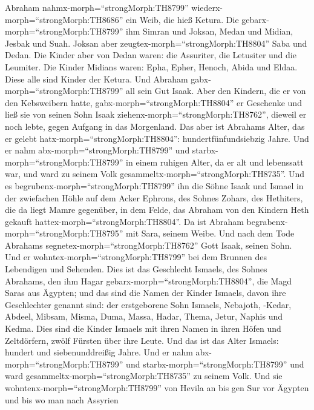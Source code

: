  Abraham nahmx-morph=``strongMorph:TH8799''
wiederx-morph=``strongMorph:TH8686'' ein Weib, die hieß Ketura.
 Die gebarx-morph=``strongMorph:TH8799'' ihm Simran und
Joksan, Medan und Midian, Jesbak und Suah.  Joksan aber
zeugtex-morph=``strongMorph:TH8804'' Saba und Dedan. Die Kinder aber von
Dedan waren: die Assuriter, die Letusiter und die Leumiter. 
Die Kinder Midians waren: Epha, Epher, Henoch, Abida und Eldaa. Diese
alle sind Kinder der Ketura.  Und Abraham
gabx-morph=``strongMorph:TH8799'' all sein Gut Isaak.  Aber
den Kindern, die er von den Kebsweibern hatte,
gabx-morph=``strongMorph:TH8804'' er Geschenke und ließ sie von seinen
Sohn Isaak ziehenx-morph=``strongMorph:TH8762'', dieweil er noch lebte,
gegen Aufgang in das Morgenland.  Das aber ist Abrahams
Alter, das er gelebt hatx-morph=``strongMorph:TH8804'':
hundertfünfundsiebzig Jahre.  Und er nahm
abx-morph=``strongMorph:TH8799'' und starbx-morph=``strongMorph:TH8799''
in einem ruhigen Alter, da er alt und lebenssatt war, und ward zu seinem
Volk gesammeltx-morph=``strongMorph:TH8735''.  Und es
begrubenx-morph=``strongMorph:TH8799'' ihn die Söhne Isaak und Ismael in
der zwiefachen Höhle auf dem Acker Ephrons, des Sohnes Zohars, des
Hethiters, die da liegt Mamre gegenüber,  in dem Felde, das
Abraham von den Kindern Heth gekauft
hattex-morph=``strongMorph:TH8804''. Da ist Abraham
begrabenx-morph=``strongMorph:TH8795'' mit Sara, seinem Weibe.
 Und nach dem Tode Abrahams
segnetex-morph=``strongMorph:TH8762'' Gott Isaak, seinen Sohn. Und er
wohntex-morph=``strongMorph:TH8799'' bei dem Brunnen des Lebendigen und
Sehenden.  Dies ist das Geschlecht Ismaels, des Sohnes
Abrahams, den ihm Hagar gebarx-morph=``strongMorph:TH8804'', die Magd
Saras aus Ägypten;  und das sind die Namen der Kinder
Ismaels, davon ihre Geschlechter genannt sind: der erstgeborene Sohn
Ismaels, Nebajoth, -Kedar, Abdeel, Mibsam,  Misma, Duma,
Massa,  Hadar, Thema, Jetur, Naphis und Kedma.
 Dies sind die Kinder Ismaels mit ihren Namen in ihren
Höfen und Zeltdörfern, zwölf Fürsten über ihre Leute.  Und
das ist das Alter Ismaels: hundert und siebenunddreißig Jahre. Und er
nahm abx-morph=``strongMorph:TH8799'' und
starbx-morph=``strongMorph:TH8799'' und ward
gesammeltx-morph=``strongMorph:TH8735'' zu seinem Volk. 
Und sie wohntenx-morph=``strongMorph:TH8799'' von Hevila an bis gen Sur
vor Ägypten und bis wo man nach Assyrien
